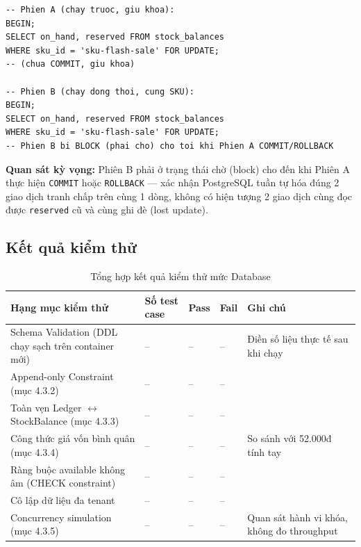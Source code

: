 \begin{lstlisting}
-- Phien A (chay truoc, giu khoa):
BEGIN;
SELECT on_hand, reserved FROM stock_balances
WHERE sku_id = 'sku-flash-sale' FOR UPDATE;
-- (chua COMMIT, giu khoa)

-- Phien B (chay dong thoi, cung SKU):
BEGIN;
SELECT on_hand, reserved FROM stock_balances
WHERE sku_id = 'sku-flash-sale' FOR UPDATE;
-- Phien B bi BLOCK (phai cho) cho toi khi Phien A COMMIT/ROLLBACK
\end{lstlisting}

\textbf{Quan sát kỳ vọng:} Phiên B phải ở trạng thái chờ (block) cho đến khi Phiên A thực hiện \texttt{COMMIT} hoặc \texttt{ROLLBACK} — xác nhận PostgreSQL tuần tự hóa đúng 2 giao dịch tranh chấp trên cùng 1 dòng, không có hiện tượng 2 giao dịch cùng đọc được \texttt{reserved} cũ và cùng ghi đè (lost update).

\subsection{Kết quả kiểm thử}

\begin{table}[htbp]
    \centering
    \small
    \caption{Tổng hợp kết quả kiểm thử mức Database}
    \begin{tabularx}{\textwidth}{|Y|p{2.2cm}|p{1.6cm}|p{1.6cm}|Y|}
        \hline
        \textbf{Hạng mục kiểm thử} & \textbf{Số test case} & \textbf{Pass} & \textbf{Fail} & \textbf{Ghi chú} \\
        \hline
        Schema Validation (DDL chạy sạch trên container mới) & -- & -- & -- & Điền số liệu thực tế sau khi chạy \\
        \hline
        Append-only Constraint (mục 4.3.2) & -- & -- & -- & \\
        \hline
        Toàn vẹn Ledger $\leftrightarrow$ StockBalance (mục 4.3.3) & -- & -- & -- & \\
        \hline
        Công thức giá vốn bình quân (mục 4.3.4) & -- & -- & -- & So sánh với 52.000đ tính tay \\
        \hline
        Ràng buộc available không âm (CHECK constraint) & -- & -- & -- & \\
        \hline
        Cô lập dữ liệu đa tenant & -- & -- & -- & \\
        \hline
        Concurrency simulation (mục 4.3.5) & -- & -- & -- & Quan sát hành vi khóa, không đo throughput \\
        \hline
    \end{tabularx}
\end{table}

